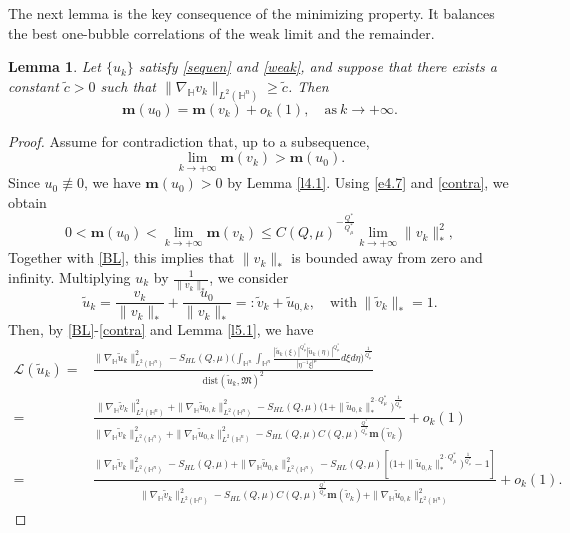 \documentclass[10pt,a4paper]{amsart}
\newtheorem{lemma}{Lemma}[section]
\begin{document}
{The next lemma is the key consequence of the minimizing property. It balances the best one-bubble correlations of the weak limit and the remainder.}
\begin{lemma}\label{l5.2}
Let $\{u_k\}$ satisfy \eqref{sequen} and \eqref{weak}, and suppose that there exists a constant $\tilde{c}>0$ such that $\|\nabla_\mathbb{H} v_k\|_{L^2(\mathbb{H}^n)}\geq \tilde{c}$. Then
\begin{equation*}
 \mathbf{m}(u_0) =\mathbf{m}(v_k)+o_k(1),\quad \mathrm{as} ~k\rightarrow+\infty.
\end{equation*}
\end{lemma}
\begin{proof}
Assume for contradiction that, up to a subsequence,
\begin{equation}\label{contra}
\lim\limits_{k\rightarrow+\infty} \mathbf{m}(v_k)> \mathbf{m}(u_0).
\end{equation}
Since $u_0\not \equiv0$, we have $\mathbf{m}(u_0)>0$ by Lemma \ref{l4.1}.
Using \eqref{e4.7} and \eqref{contra}, we obtain
\begin{equation*}
 0<\mathbf{m}(u_0)< \lim\limits_{k\rightarrow+\infty}\mathbf{m}(v_k)\leq C(Q,\mu)^{-\frac{Q^{\ast}}{Q^{\ast}_{\mu}}}\lim\limits_{k\rightarrow+\infty}\|v_k\|_*^2,
\end{equation*}
Together with \eqref{BL}, this implies that $\|v_k\|_*$ is bounded away from zero and infinity. Multiplying $u_k$ by $\frac{1}{\|v_k\|_*}$, we consider
\begin{equation*}
 \tilde{u}_k=\frac{v_k}{\|v_k\|_*}+\frac{u_0}{\|v_k\|_*}=:\tilde{v}_k+\tilde{u}_{0,k},\quad \mathrm{with}~\|\tilde{v}_k\|_*=1.
\end{equation*}
Then, by \eqref{BL}-\eqref{contra} and Lemma \ref{l5.1}, we have
\begin{align*}
 \mathcal{L}(\tilde{u}_k)=&\frac{\|\nabla_\mathbb{H} \tilde{u}_k\|_{L^2(\mathbb{H}^n)}^2-S_{HL}(Q,\mu) \Big(\int_{\mathbb{H}^{n}}\int_{\mathbb{H}^{n}}\frac{|\tilde{u}_k(\xi)|^{Q^{\ast}_{\mu}}|\tilde{u}_k(\eta)|
^{Q^{\ast}_{\mu}}}{|\eta^{-1}\xi|^{\mu}}{d}\xi{d}\eta\Big)^{\frac{1}{Q^{\ast}_{\mu}}}}{\mathrm{dist}(\tilde{u}_k,\mathfrak{M})^2}\\
=&\frac{\|\nabla_\mathbb{H} \tilde{v}_k\|_{L^2(\mathbb{H}^n)}^2+\|\nabla_\mathbb{H} \tilde{u}_{0,k}\|_{L^2(\mathbb{H}^n)}^2-S_{HL}(Q,\mu) \Big(1+\|\tilde{u}_{0,k}\|_*^{2\cdot Q^{\ast}_{\mu}}\Big)^{\frac{1}{Q^{\ast}_{\mu}}}}
{\|\nabla_\mathbb{H} \tilde{v}_k\|_{L^2(\mathbb{H}^n)}^2+\|\nabla_\mathbb{H} \tilde{u}_{0,k}\|_{L^2(\mathbb{H}^n)}^2-S_{HL}(Q,\mu)C(Q,\mu)^{\frac{Q^{\ast}}{Q^{\ast}_{\mu}}}\mathbf{m}(\tilde{v}_k)}+o_k(1)\\
=&\frac{\|\nabla_\mathbb{H} \tilde{v}_k\|_{L^2(\mathbb{H}^n)}^2-S_{HL}(Q,\mu)+\|\nabla_\mathbb{H} \tilde{u}_{0,k}\|_{L^2(\mathbb{H}^n)}^2-S_{HL}(Q,\mu) \left[\Big(1+\|\tilde{u}_{0,k}\|_*^{2\cdot Q^{\ast}_{\mu}}\Big)^{\frac{1}{Q^{\ast}_{\mu}}}-1\right]}
{\|\nabla_\mathbb{H} \tilde{v}_k\|_{L^2(\mathbb{H}^n)}^2-S_{HL}(Q,\mu)C(Q,\mu)^{\frac{Q^{\ast}}{Q^{\ast}_{\mu}}}\mathbf{m}(\tilde{v}_k)+
\|\nabla_\mathbb{H} \tilde{u}_{0,k}\|_{L^2(\mathbb{H}^n)}^2}+o_k(1).
\end{align*}


\end{proof}
\end{document}
